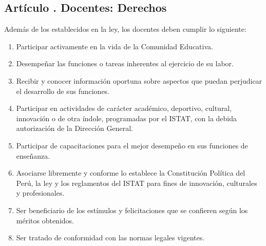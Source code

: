 \subsection{Artículo . Docentes: Derechos}
\addtocounter{ns}{1}
Además de los establecidos en la ley, los docentes deben cumplir lo siguiente:
\begin{enumerate}
\item Participar activamente en la vida de la Comunidad Educativa.
\item Desempeñar las funciones o tareas inherentes al ejercicio de su labor.
\item Recibir y conocer información oportuna sobre aspectos que puedan perjudicar el desarrollo de sus funciones.
\item Participar en actividades de carácter académico, deportivo, cultural, innovación o de otra índole, programadas por el ISTAT, con la debida autorización de la Dirección General.
\item Participar de capacitaciones para el mejor desempeño en sus funciones de enseñanza.
\item Asociarse libremente y conforme lo establece la Constitución Política del Perú, la ley y los reglamentos del ISTAT para fines de innovación, culturales y profesionales.
\item Ser beneficiario de los estímulos y felicitaciones que se confieren según los méritos obtenidos.
\item Ser tratado de conformidad con las normas legales vigentes.
\end{enumerate}
